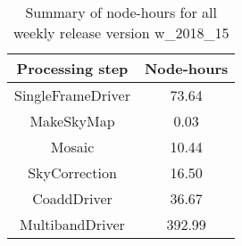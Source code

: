 \begin{table}[h]
  \centering
  \begin{tabular} {|c|c|}
    \hline
    Processing step & Node-hours \\
    \hline
    SingleFrameDriver &  73.64 \\ 
    MakeSkyMap        &   0.03 \\
    Mosaic            &  10.44 \\
    SkyCorrection     &  16.50 \\
    CoaddDriver       &  36.67 \\
    MultibandDriver   & 392.99 \\
    \hline
  \end{tabular}
  \caption{Summary of node-hours for all weekly release version w\_2018\_15}
  \label{tbl:PerTask15}
\end{table}
